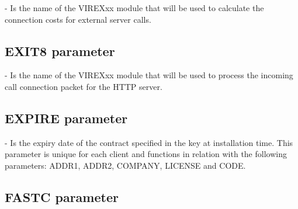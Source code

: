 \documentclass[letterpaper,10pt,english]{sphinxmanual}
\begin{document}
 - Is the name of the VIREXxx module that will be used to calculate the connection costs for external server calls.


\subsection{EXIT8 parameter}
\label{\detokenize{Installation_Guide:exit8-parameter}}\label{\detokenize{Installation_Guide:index-61}}
\begin{sphinxVerbatim}[commandchars=\\\{\}]
 
\end{sphinxVerbatim}

 - Is the name of the VIREXxx module that will be used to process the incoming call connection packet for the HTTP server.


\subsection{EXPIRE parameter}
\label{\detokenize{Installation_Guide:expire-parameter}}\label{\detokenize{Installation_Guide:index-62}}
\begin{sphinxVerbatim}[commandchars=\\\{\}]
 
\end{sphinxVerbatim}

 - Is the expiry date of the contract specified in the key at installation time. This parameter is unique for each client and functions in relation with the following parameters: ADDR1, ADDR2, COMPANY, LICENSE and CODE.


\subsection{FASTC parameter}
\label{\detokenize{Installation_Guide:fastc-parameter}}\label{\detokenize{Installation_Guide:index-63}}
\begin{sphinxVerbatim}[commandchars=\\\{\}]
 
\end{sphinxVerbatim}
\end{document}
